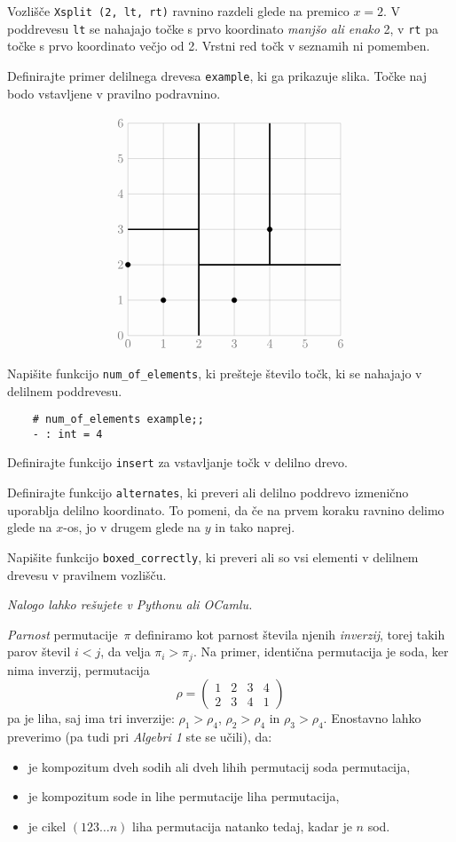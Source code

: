 \documentclass[arhiv]{../izpit}
\begin{document}
  Vozlišče \verb|Xsplit (2, lt, rt)| ravnino razdeli glede na premico $x=2$. V poddrevesu \verb|lt| se nahajajo točke s prvo koordinato \emph{manjšo ali enako} 2, v \verb|rt| pa točke s prvo koordinato večjo od 2. Vrstni red točk v seznamih ni pomemben.
	
  \podnaloga Definirajte primer delilnega drevesa \verb|example|, ki ga prikazuje slika. Točke naj bodo vstavljene v pravilno podravnino.
	
	\[
    \begin{tikzpicture}
      \foreach \i in {0,...,6} {
          \draw [very thin,gray] (\i,0) -- (\i,6)  node [below] at (\i,0) {$\i$};
      }
      \foreach \i in {0,...,6} {
          \draw [very thin,gray] (0,\i) -- (6,\i) node [left] at (0,\i) {$\i$};
      }
	
  \draw[very thick] (2,0) -- (2,6);
  \draw[very thick] (0,3) -- (2,3);
  \draw[very thick] (2,2) -- (6,2);
  \draw[very thick] (4,2) -- (4,6);
  \filldraw[black] (1,1) circle (2pt);
  \filldraw[black] (0,2) circle (2pt);
  \filldraw[black] (3,1) circle (2pt);
  \filldraw[black] (4,3) circle (2pt);
  \end{tikzpicture}
  \]
	
  \podnaloga Napišite funkcijo \verb|num_of_elements|, ki prešteje število točk, ki se nahajajo v delilnem poddrevesu.
  \begin{verbatim}
	# num_of_elements example;;
	- : int = 4
	\end{verbatim}
	
  \podnaloga Definirajte funkcijo \verb|insert| za vstavljanje točk v delilno drevo.
    
  \podnaloga Definirajte funkcijo \verb|alternates|, ki preveri ali delilno poddrevo izmenično uporablja delilno koordinato. To pomeni, da če na prvem koraku ravnino delimo glede na $x$-os, jo v drugem glede na $y$ in tako naprej.

  \podnaloga Napišite funkcijo \verb|boxed_correctly|, ki preveri ali so vsi elementi v delilnem drevesu v pravilnem vozlišču. 

  \naloga
  
  \emph{Nalogo lahko rešujete v Pythonu ali OCamlu.}

  \emph{Parnost} permutacije~$\pi$ definiramo kot parnost števila njenih \emph{inverzij}, torej takih parov števil $i < j$, da velja $\pi_i > \pi_j$. Na primer, identična permutacija je soda, ker nima inverzij, permutacija
  \[
    \rho = \begin{pmatrix}1 & 2 & 3 & 4 \\ 2 & 3 & 4 & 1 \end{pmatrix}
  \]
  pa je liha, saj ima tri inverzije: $\rho_1 > \rho_4$, $\rho_2 > \rho_4$ in $\rho_3 > \rho_4$. Enostavno lahko preverimo (pa tudi pri \emph{Algebri 1} ste se učili), da:
  \begin{itemize}
    \item je kompozitum dveh sodih ali dveh lihih permutacij soda permutacija,
    \item je kompozitum sode in lihe permutacije liha permutacija,
    \item je cikel $(1 2 3 \dots n)$ liha permutacija natanko tedaj, kadar je $n$ sod.
  \end{itemize}
\end{document}
